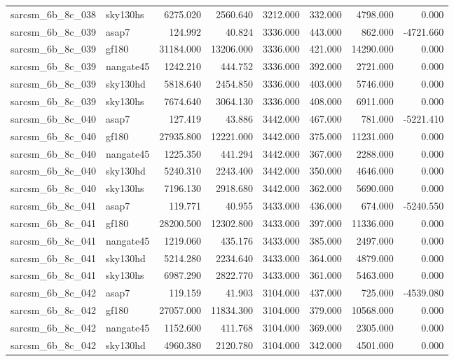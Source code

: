 \begin{tabular}{llrrrrrr}
sarcsm\_6b\_8c\_038 & sky130hs & 6275.020 & 2560.640 & 3212.000 & 332.000 & 4798.000 & 0.000 \\
sarcsm\_6b\_8c\_039 & asap7 & 124.992 & 40.824 & 3336.000 & 443.000 & 862.000 & -4721.660 \\
sarcsm\_6b\_8c\_039 & gf180 & 31184.000 & 13206.000 & 3336.000 & 421.000 & 14290.000 & 0.000 \\
sarcsm\_6b\_8c\_039 & nangate45 & 1242.210 & 444.752 & 3336.000 & 392.000 & 2721.000 & 0.000 \\
sarcsm\_6b\_8c\_039 & sky130hd & 5818.640 & 2454.850 & 3336.000 & 403.000 & 5746.000 & 0.000 \\
sarcsm\_6b\_8c\_039 & sky130hs & 7674.640 & 3064.130 & 3336.000 & 408.000 & 6911.000 & 0.000 \\
sarcsm\_6b\_8c\_040 & asap7 & 127.419 & 43.886 & 3442.000 & 467.000 & 781.000 & -5221.410 \\
sarcsm\_6b\_8c\_040 & gf180 & 27935.800 & 12221.000 & 3442.000 & 375.000 & 11231.000 & 0.000 \\
sarcsm\_6b\_8c\_040 & nangate45 & 1225.350 & 441.294 & 3442.000 & 367.000 & 2288.000 & 0.000 \\
sarcsm\_6b\_8c\_040 & sky130hd & 5240.310 & 2243.400 & 3442.000 & 350.000 & 4646.000 & 0.000 \\
sarcsm\_6b\_8c\_040 & sky130hs & 7196.130 & 2918.680 & 3442.000 & 362.000 & 5690.000 & 0.000 \\
sarcsm\_6b\_8c\_041 & asap7 & 119.771 & 40.955 & 3433.000 & 436.000 & 674.000 & -5240.550 \\
sarcsm\_6b\_8c\_041 & gf180 & 28200.500 & 12302.800 & 3433.000 & 397.000 & 11336.000 & 0.000 \\
sarcsm\_6b\_8c\_041 & nangate45 & 1219.060 & 435.176 & 3433.000 & 385.000 & 2497.000 & 0.000 \\
sarcsm\_6b\_8c\_041 & sky130hd & 5214.280 & 2234.640 & 3433.000 & 364.000 & 4879.000 & 0.000 \\
sarcsm\_6b\_8c\_041 & sky130hs & 6987.290 & 2822.770 & 3433.000 & 361.000 & 5463.000 & 0.000 \\
sarcsm\_6b\_8c\_042 & asap7 & 119.159 & 41.903 & 3104.000 & 437.000 & 725.000 & -4539.080 \\
sarcsm\_6b\_8c\_042 & gf180 & 27057.000 & 11834.300 & 3104.000 & 379.000 & 10568.000 & 0.000 \\
sarcsm\_6b\_8c\_042 & nangate45 & 1152.600 & 411.768 & 3104.000 & 369.000 & 2305.000 & 0.000 \\
sarcsm\_6b\_8c\_042 & sky130hd & 4960.380 & 2120.780 & 3104.000 & 342.000 & 4501.000 & 0.000 \\

\end{tabular}
